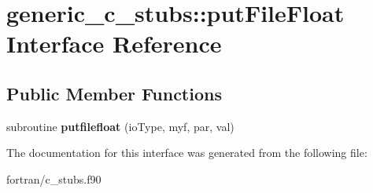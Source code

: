 \hypertarget{interfacegeneric__c__stubs_1_1put_file_float}{}\section{generic\+\_\+c\+\_\+stubs\+:\+:put\+File\+Float Interface Reference}
\label{interfacegeneric__c__stubs_1_1put_file_float}
\subsection*{Public Member Functions}
\begin{DoxyCompactItemize}
\item 
\mbox{\label{interfacegeneric__c__stubs_1_1put_file_float_a954d818e68f484639d9c3ca8a2a12c4d}} 
subroutine {\bfseries putfilefloat} (io\+Type, myf, par, val)
\end{DoxyCompactItemize}


The documentation for this interface was generated from the following file\+:\begin{DoxyCompactItemize}
\item 
fortran/c\+\_\+stubs.\+f90\end{DoxyCompactItemize}
